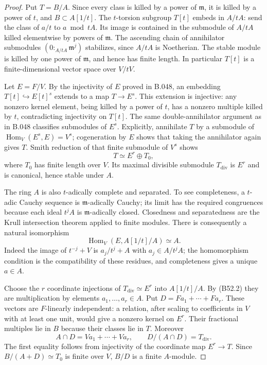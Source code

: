 \begin{proof}
Put $T=B/A$. Since every class is killed by a power
of $\mathfrak m$, it is killed by a power of $t$,
and $B\subset A[1/t]$.
The $t$-torsion subgroup $T[t]$ embeds in $A/tA$:
send the class of $a/t$ to $a\bmod tA$.
Its image is contained in the submodule of $A/tA$
killed elementwise by powers of $\mathfrak m$.
The ascending chain of annihilator submodules
$(0:_{A/tA}\mathfrak m^j)$ stabilizes, since
$A/tA$ is Noetherian. The stable module is killed
by one power of $\mathfrak m$, and hence has finite
length. In particular $T[t]$ is a finite-dimensional
vector space over $V/tV$.

Let $E=F/V$. By the injectivity of $E$ proved in
B.048, an embedding $T[t]\hookrightarrow E[t]^s$
extends to a map $T\to E^s$. This extension is
injective: any nonzero kernel element, being killed
by a power of $t$, has a nonzero multiple killed
by $t$, contradicting injectivity on $T[t]$.
The same double-annihilator argument as in B.048
classifies submodules of $E^s$. Explicitly, annihilate
$T$ by a submodule of
$\operatorname{Hom}_V(E^s,E)=V^s$; cogeneration by
$E$ shows that taking the annihilator again gives
$T$. Smith reduction of that finite submodule of
$V^s$ shows
\[
                            T\simeq E^r\oplus T_0,
\]
where $T_0$ has finite length over $V$.
Its maximal divisible submodule $T_{\mathrm{div}}$
is $E^r$ and is canonical, hence stable under $A$.

The ring $A$ is also $t$-adically complete and
separated. To see completeness, a $t$-adic Cauchy
sequence is $\mathfrak m$-adically Cauchy; its limit
has the required congruences because each ideal
$t^jA$ is $\mathfrak m$-adically closed.
Closedness and separatedness are the Krull
intersection theorem applied to finite modules.
There is consequently a natural isomorphism
\[
 \operatorname{Hom}_V(E,A[1/t]/A)\simeq A.                  \tag{B52.2}
\]
Indeed the image of $t^{-j}+V$ is
$a_j/t^j+A$ with $a_j\in A/t^jA$; the homomorphism
condition is the compatibility of these residues,
and completeness gives a unique $a\in A$.

Choose the $r$ coordinate injections of
$T_{\mathrm{div}}\simeq E^r$ into $A[1/t]/A$.
By (B52.2) they are multiplication by elements
$a_1,\ldots,a_r\in A$. Put
$D=Fa_1+\cdots+Fa_r$.
These vectors are $F$-linearly independent:
a relation, after scaling to coefficients in
$V$ with at least one unit, would give a nonzero
kernel on $E^r$.
Their fractional multiples lie in $B$ because
their classes lie in $T$. Moreover
\[
              A\cap D=Va_1+\cdots+Va_r,\qquad
              D/(A\cap D)=T_{\mathrm{div}}.
\]
The first equality follows from injectivity of
the coordinate map $E^r\to T$.
Since $B/(A+D)\simeq T_0$ is finite over $V$,
$B/D$ is a finite $A$-module.


\end{proof}
